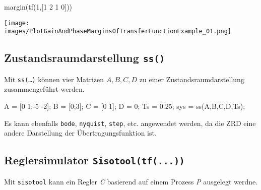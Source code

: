 \documentclass[
  10pt,
  a4paper,
  twocolumn]{article}
\newenvironment{Shaded}{}{}
\newcommand{\DecValTok}[1]{\textcolor[rgb]{0.00,0.36,0.77}{#1}}
\newcommand{\FloatTok}[1]{\textcolor[rgb]{0.00,0.36,0.77}{#1}}
\newcommand{\NormalTok}[1]{\textcolor[rgb]{0.14,0.16,0.18}{#1}}
\newcommand{\OperatorTok}[1]{\textcolor[rgb]{0.14,0.16,0.18}{#1}}
\newcommand{\OtherTok}[1]{\textcolor[rgb]{0.44,0.26,0.76}{#1}}
\newcommand{\VariableTok}[1]{\textcolor[rgb]{0.89,0.38,0.04}{#1}}
\numberwithin{equation}{section}
\begin{document}
\begin{Shaded}
\begin{Highlighting}[]
\NormalTok{margin(tf(}\DecValTok{1}\OtherTok{,[}\DecValTok{1} \DecValTok{2} \DecValTok{1} \DecValTok{0}\OtherTok{]}\NormalTok{))}
\end{Highlighting}
\end{Shaded}

\texttt{[image: images/PlotGainAndPhaseMarginsOfTransferFunctionExample\_01.png]}

\subsection{\texorpdfstring{Zustandsraumdarstellung
\texttt{ss()}}{Zustandsraumdarstellung ss()}}\label{zustandsraumdarstellung-ss}

Mit \texttt{ss(…)} können vier Matrizen \(A, B,C,D\) zu einer
Zustandsraumdarstellung zusammengeführt werden.

\begin{Shaded}
\begin{Highlighting}[]
\VariableTok{A} \OperatorTok{=}\NormalTok{ [}\FloatTok{0} \FloatTok{1}\OperatorTok{;{-}}\FloatTok{5} \OperatorTok{{-}}\FloatTok{2}\NormalTok{]}\OperatorTok{;}
\VariableTok{B} \OperatorTok{=}\NormalTok{ [}\FloatTok{0}\OperatorTok{;}\FloatTok{3}\NormalTok{]}\OperatorTok{;}
\VariableTok{C} \OperatorTok{=}\NormalTok{ [}\FloatTok{0} \FloatTok{1}\NormalTok{]}\OperatorTok{;}
\VariableTok{D} \OperatorTok{=} \FloatTok{0}\OperatorTok{;}
\VariableTok{Ts} \OperatorTok{=} \FloatTok{0.25}\OperatorTok{;}
\VariableTok{sys} \OperatorTok{=} \VariableTok{ss}\NormalTok{(}\VariableTok{A}\OperatorTok{,}\VariableTok{B}\OperatorTok{,}\VariableTok{C}\OperatorTok{,}\VariableTok{D}\OperatorTok{,}\VariableTok{Ts}\NormalTok{)}\OperatorTok{;}
\end{Highlighting}
\end{Shaded}

Es kann ebenfalls \texttt{bode}, \texttt{nyquist}, \texttt{step}, etc.
angewendet werden, da die ZRD eine andere Darstellung der
Übertragungsfunktion ist.

\subsection{\texorpdfstring{Reglersimulator
\texttt{Sisotool(tf(...))}}{Reglersimulator Sisotool(tf(...))}}\label{reglersimulator-sisotooltf...}

Mit \texttt{sisotool} kann ein Regler \emph{C} basierend auf einem
Prozess \emph{P} ausgelegt werdne.
\end{document}
